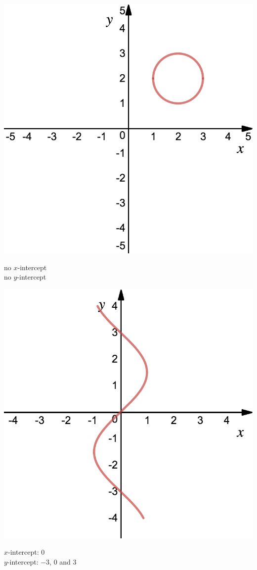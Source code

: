 \vspace{1cm}
\begin{minipage}{0.3\textwidth}%
\includegraphics[width=\linewidth]{pics/ex5.png}
\end{minipage}%
\hfill%
\begin{minipage}{0.6\textwidth}
no $x$-intercept \\
no $y$-intercept
\end{minipage}

\vspace{1cm}
\begin{minipage}{0.3\textwidth}%
\includegraphics[width=\linewidth]{pics/ex6.png}
\end{minipage}%
\hfill%
\begin{minipage}{0.6\textwidth}
$x$-intercept: $0$ \\
$y$-intercept: $-3$, $0$ and $3$
\end{minipage}

